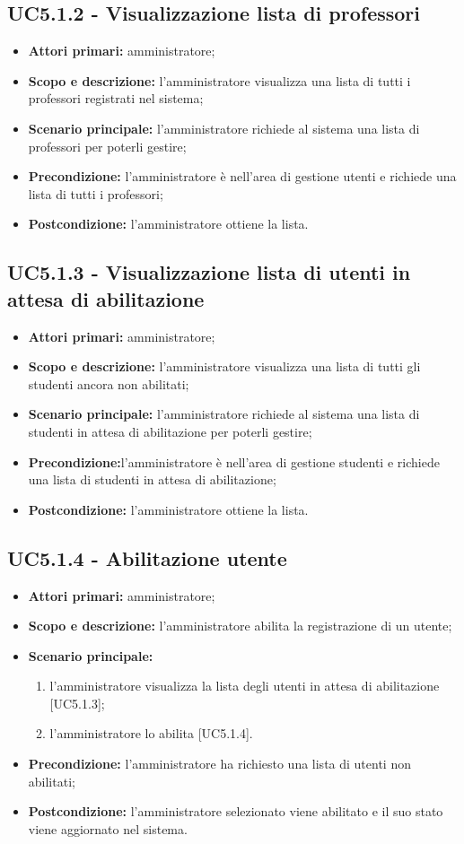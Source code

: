\documentclass[AnalisiDeiRequisiti.tex]{subfiles}
\begin{document}
\subsection{UC5.1.2 - Visualizzazione lista di professori}
\begin{itemize}
	\item \textbf{Attori primari:} amministratore;
	\item \textbf{Scopo e descrizione:} l'amministratore visualizza una lista di tutti i professori registrati nel sistema;
	\item \textbf{Scenario principale:} l'amministratore richiede al sistema una lista di professori per poterli gestire;
	\item \textbf{Precondizione:} l'amministratore è nell'area di gestione utenti e richiede una lista di tutti i professori; 
	\item \textbf{Postcondizione:} l'amministratore ottiene la lista.
\end{itemize}
\subsection{UC5.1.3 - Visualizzazione lista di utenti in attesa di abilitazione}
\begin{itemize}
	\item \textbf{Attori primari:} amministratore;
	\item \textbf{Scopo e descrizione:} l'amministratore visualizza una lista di tutti gli studenti ancora non abilitati;
	\item \textbf{Scenario principale:} l'amministratore richiede al sistema una lista di studenti in attesa di abilitazione per poterli gestire;
	\item \textbf{Precondizione:}l'amministratore è nell'area di gestione studenti e richiede una lista di studenti in attesa di abilitazione; 
	\item \textbf{Postcondizione:} l'amministratore ottiene la lista.
\end{itemize}
\subsection{UC5.1.4 - Abilitazione utente}
\begin{itemize}
	\item \textbf{Attori primari:} amministratore;
	\item \textbf{Scopo e descrizione:} l'amministratore abilita la registrazione di un utente;
	\item \textbf{Scenario principale:}
	\begin{enumerate}
		\item l'amministratore visualizza la lista degli utenti in attesa di abilitazione [UC5.1.3];
		\item l'amministratore lo abilita [UC5.1.4].
	\end{enumerate}
	\item \textbf{Precondizione:} l'amministratore ha richiesto una lista di utenti non abilitati; 
	\item \textbf{Postcondizione:} l'amministratore selezionato viene abilitato e il suo stato viene aggiornato nel sistema.
\end{itemize}
\end{document}
